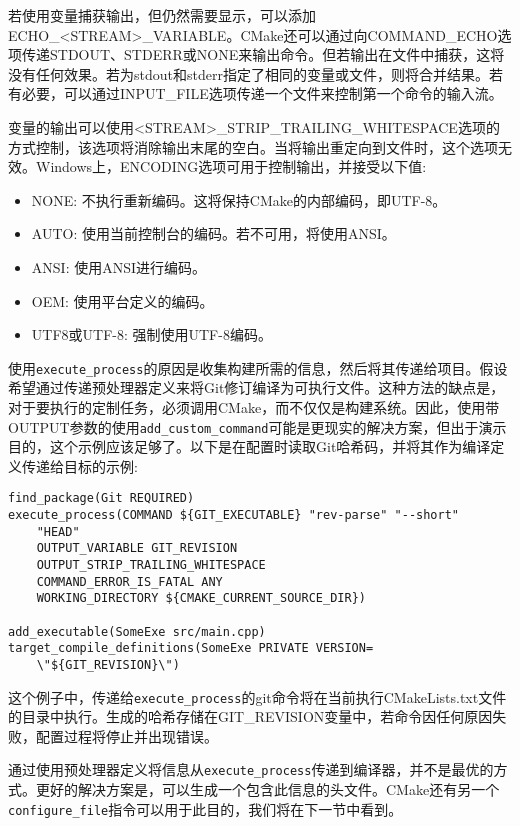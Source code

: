若使用变量捕获输出，但仍然需要显示，可以添加ECHO\_<STREAM>\_VARIABLE。CMake还可以通过向COMMAND\_ECHO选项传递STDOUT、STDERR或NONE来输出命令。但若输出在文件中捕获，这将没有任何效果。若为stdout和stderr指定了相同的变量或文件，则将合并结果。若有必要，可以通过INPUT\_FILE选项传递一个文件来控制第一个命令的输入流。

变量的输出可以使用<STREAM>\_STRIP\_TRAILING\_WHITESPACE选项的方式控制，该选项将消除输出末尾的空白。当将输出重定向到文件时，这个选项无效。Windows上，ENCODING选项可用于控制输出，并接受以下值:

\begin{itemize}
\item 
NONE: 不执行重新编码。这将保持CMake的内部编码，即UTF-8。

\item 
AUTO: 使用当前控制台的编码。若不可用，将使用ANSI。

\item 
ANSI: 使用ANSI进行编码。

\item 
OEM: 使用平台定义的编码。

\item 
UTF8或UTF-8: 强制使用UTF-8编码。
\end{itemize}

使用\texttt{execute\_process}的原因是收集构建所需的信息，然后将其传递给项目。假设希望通过传递预处理器定义来将Git修订编译为可执行文件。这种方法的缺点是，对于要执行的定制任务，必须调用CMake，而不仅仅是构建系统。因此，使用带OUTPUT参数的使用\texttt{add\_custom\_command}可能是更现实的解决方案，但出于演示目的，这个示例应该足够了。以下是在配置时读取Git哈希码，并将其作为编译定义传递给目标的示例:

\begin{lstlisting}[style=styleCMake]
find_package(Git REQUIRED)
execute_process(COMMAND ${GIT_EXECUTABLE} "rev-parse" "--short"
	"HEAD"
	OUTPUT_VARIABLE GIT_REVISION
	OUTPUT_STRIP_TRAILING_WHITESPACE
	COMMAND_ERROR_IS_FATAL ANY
	WORKING_DIRECTORY ${CMAKE_CURRENT_SOURCE_DIR})

add_executable(SomeExe src/main.cpp)
target_compile_definitions(SomeExe PRIVATE VERSION=
	\"${GIT_REVISION}\")
\end{lstlisting}

这个例子中，传递给\texttt{execute\_process}的git命令将在当前执行CMakeLists.txt文件的目录中执行。生成的哈希存储在GIT\_REVISION变量中，若命令因任何原因失败，配置过程将停止并出现错误。

通过使用预处理器定义将信息从\texttt{execute\_process}传递到编译器，并不是最优的方式。更好的解决方案是，可以生成一个包含此信息的头文件。CMake还有另一个\texttt{configure\_file}指令可以用于此目的，我们将在下一节中看到。

















